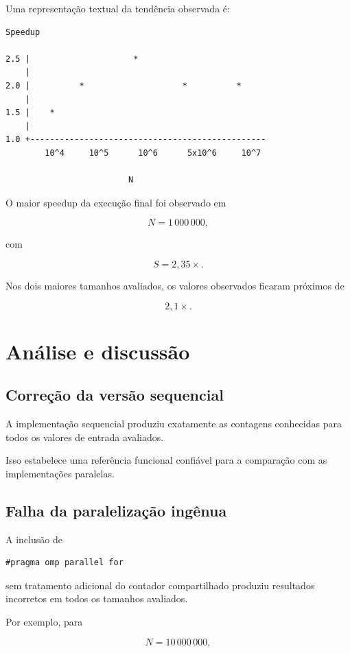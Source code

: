 Uma representação textual da tendência observada é:

\begin{verbatim}
Speedup

2.5 |                     *
    |
2.0 |          *                    *          *
    |
1.5 |    *
    |
1.0 +------------------------------------------------
        10^4     10^5      10^6      5x10^6     10^7

                         N
\end{verbatim}

O maior speedup da execução final foi observado em

\[
N=1\,000\,000,
\]

com

\[
S=2,35\times.
\]

Nos dois maiores tamanhos avaliados, os valores observados ficaram próximos
de

\[
2,1\times.
\]


\section{Análise e discussão}
\label{sec:atvd05-discussao}

\subsection{Correção da versão sequencial}

A implementação sequencial produziu exatamente as contagens conhecidas para
todos os valores de entrada avaliados.

Isso estabelece uma referência funcional confiável para a comparação com
as implementações paralelas.


\subsection{Falha da paralelização ingênua}

A inclusão de

\begin{verbatim}
#pragma omp parallel for
\end{verbatim}

sem tratamento adicional do contador compartilhado produziu resultados
incorretos em todos os tamanhos avaliados.

Por exemplo, para

\[
N=10\,000\,000,
\]

